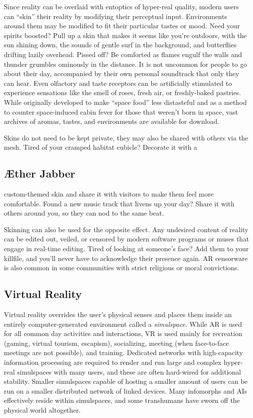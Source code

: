 Since reality can be overlaid with entoptics of hyper-real 
quality, modern users can ``skin'' their reality by modifying
their perceptual input. Environments around them
may be modified to fit their particular tastes or mood. 
Need your spirits boosted? Pull up a skin that makes it 
seems like you're outdoors, with the sun shining down, 
the sounds of gentle surf in the background, and butterflies
drifting lazily overhead. Pissed off? Be comforted as
flames engulf the walls and thunder grumbles ominously 
in the distance. It is not uncommon for people to go 
about their day, accompanied by their own personal 
soundtrack that only they can hear. Even olfactory and 
taste receptors can be artificially stimulated to experience
sensations like the smell of roses, fresh air, or freshly-baked
pastries. While originally developed to make
``space food'' less distasteful and as a method to counter 
space-induced cabin fever for those that weren't born in 
space, vast archives of aromas, tastes, and environments 
are available for download.

Skins do not need to be kept private, they may 
also be shared with others via the mesh. Tired of 
your cramped habitat cubicle? Decorate it with a 

\subsection{Æther Jabber}

custom-themed skin and share it with visitors to make 
them feel more comfortable. Found a new music track 
that livens up your day? Share it with others around 
you, so they can nod to the same beat.

Skinning can also be used for the opposite effect. 
Any undesired content of reality can be edited out, 
veiled, or censored by modern software programs or 
muses that engage in real-time editing. Tired of looking
at someone's face? Add them to your killfile, and
you'll never have to acknowledge their presence again. 
AR censorware is also common in some communities 
with strict religious or moral convictions.

\subsection{Virtual Reality}

Virtual reality overrides the user's physical senses and 
places them inside an entirely computer-generated 
environment called a \textit{simulspace.} While AR is used 
for all common day activities and interactions, VR is 
used mainly for recreation (gaming, virtual tourism, 
escapism), socializing, meeting (when face-to-face 
meetings are not possible), and training. Dedicated 
networks with high-capacity information processing 
are required to render and run large and complex 
hyper-real simulspaces with many users, and these 
are often hard-wired for additional stability. Smaller 
simulspaces capable of hosting a smaller amount of 
users can be run on a smaller distributed network of 
linked devices. Many infomorphs and AIs effectively 
reside within simulspaces, and some transhumans 
have sworn off the physical world altogether.

